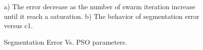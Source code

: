 \documentclass[preprint,10pt,5p,twocolumn]{elsarticle}
\begin{document}
 \begin{figure}
	\centering		
	 

 
		
		
		
	 	\caption{Segmentation Error Vs. PSO parameters.}a) The error decrease as the number of swarm iteration increase until it reach a saturation.   b) The behavior of segmentation error versus c1. 
	 
	
\end{figure} 
\end{document}
